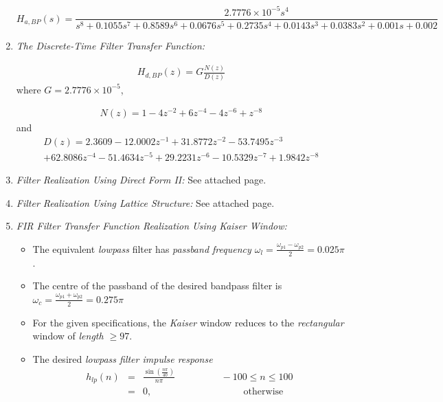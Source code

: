 \documentclass{article}
\begin{document}
\begin{enumerate}
{\tiny
\begin{equation}
\label{bpfinal}
H_{a,BP}(s) = \frac{2.7776\times 10^{-5}s^4}{s^8+0.1055s^7+0.8589s^6+0.0676s^5+0.2735s^4+0.0143s^3+0.0383s^2+0.001s+0.002}
\end{equation}
}

\item {\em The Discrete-Time Filter Transfer Function:}

\begin{eqnarray}
H_{d,BP}(z) = G \frac{N(z)}{D(z)}
\end{eqnarray}
where $G = 2.7776 \times 10^{-5}$,

\begin{eqnarray}
N(z)=  1 - 4 z^{-2} + 6 z^{-4} - 4z^{-6} + z^{-8} 
\end{eqnarray}
and
\begin{eqnarray}
D(z) = 2.3609  -12.0002z^{-1} + 31.8772z^{-2}  -53.7495z^{-3}\nonumber \\+  62.8086z^{-4}
  -51.4634z^{-5}+   29.2231z^{-6}  -10.5329z^{-7} +   1.9842z^{-8}
\end{eqnarray}

\item {\em Filter Realization Using Direct Form II:} See attached page.

\item {\em Filter Realization Using Lattice Structure:} See attached page.

\item {\em FIR Filter Transfer Function Realization Using Kaiser Window:}

\begin{itemize}
\item The equivalent {\em lowpass} filter has {\em passband frequency $\omega_l = \frac{\omega_{p1} - \omega_{p2}}{2} = 0.025\pi$}.

\item The centre of the passband of the desired bandpass filter is $\omega_c = \frac{\omega_{p1} + \omega_{p2}}{2} = 0.275\pi$
\item For the given specifications, the {\em Kaiser} window reduces to the {\em rectangular} window of {\em length
$\geq 97$}.
\item The desired {\em lowpass filter impulse response}
\begin{eqnarray}
\label{firlpfinal}
h_{lp}(n) &=& \frac{\sin(\frac{n\pi}{40})}{n\pi} \hspace{2cm} -100 \leq n \leq 100 \nonumber \\
&=& 0, \hspace{4cm} \mbox{otherwise}
\end{eqnarray}


\end{itemize}
\end{enumerate}
\end{document}
